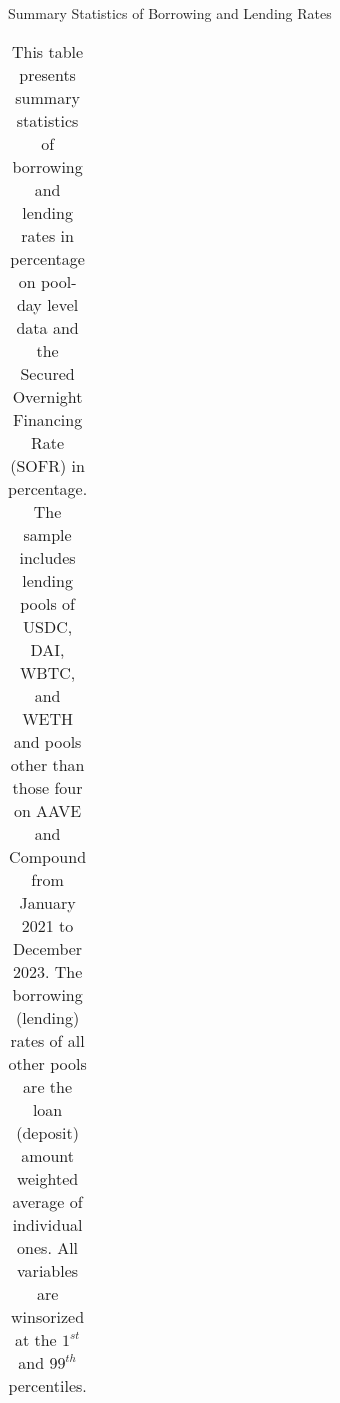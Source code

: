 \clearpage
\newpage
        

\begin{table}[ht!]
\caption{Summary Statistics of Borrowing and Lending Rates}\label{tab:pool_sumstat_I}
\caption*{This table presents summary statistics of borrowing and lending rates in percentage on pool-day level data and the Secured Overnight Financing Rate (SOFR) in percentage. The sample includes lending pools of USDC, DAI, WBTC, and WETH and pools other than those four on AAVE and Compound from January 2021 to December 2023. The borrowing (lending) rates of all other pools are the loan (deposit) amount weighted average of individual ones. All variables are winsorized at the $1^{st}$ and $99^{th}$ percentiles.}


\centering
\def\sym#1{\ifmmode^{#1}\else\(^{#1}\)\fi}


\begin{tabular*}{\linewidth}{@{\extracolsep{\fill}}lccccccc}


\end{tabular*}
\end{table}
